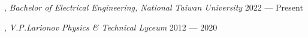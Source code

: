 , \textit{Bachelor of Electrical Engineering, National Taiwan University}	\hfill 2022 --- Present

, \textit{V.P.Larionov Physics \& Technical Lyceum}	\hfill 2012 --- 2020

